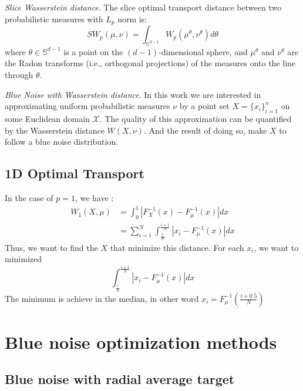 \documentclass{classeENS}
\begin{document}
\> \textit{Slice Wasserstein distance}. The slice optimal transport distance 
    between two probabilistic measures with $L_p$ norm is:
    \[SW_p(\mu, \nu) = \int_{\mathbb{S}^{d-1}} W_p(\mu^\theta,\nu^\theta) d\theta\]
    where $\theta \in \mathbb{S}^{d-1}$ is a point on the $(d-1)$-dimensional sphere, 
    and $\mu^\theta$ and $\nu^\theta$ are the Radon transforms (i.e., orthogonal 
    projections) of the measures onto the line through $\theta$.


\> \textit{Blue Noise with Wasserstein distance}. In this work we are 
    interested in approximating uniform probabilistic measures $\nu$ by a 
    point set $X = \{x_i\}_{i=1}^n$ on some Euclidean domain $\mathcal X$. 
    The quality of this approximation can be quantified by the Wasserstein 
    distance $W(X, \nu)$. 
    And the result of doing so, make $X$ to follow a blue noise distribution.

\subsection{1D Optimal Transport}
\noindent In the case of $p=1$, we have :
\begin{align*}
    W_1(X,\mu) &= \int_0^1 |F_X^{-1}(x) - F_\mu^{-1}(x)| dx \\
               &= \sum_{i=1}^N \int_{\frac{i}{N}}^{\frac{i+1}{N}} |x_i - F_\mu^{-1}(x)| dx
\end{align*}
Thus, we want to find the $X$ that minimize this distance. For each $x_i$, we want to minimized
\[ \int_{\frac{i}{N}}^{\frac{i+1}{N}} |x_i - F_\mu^{-1}(x)| dx \]
The minimum is achieve in the median, in other word $x_i = F_\mu^{-1}\left (\frac{i+0.5}{N} \right )$


\section{Blue noise optimization methods}

\subsection{Blue noise with radial average target}
\end{document}
